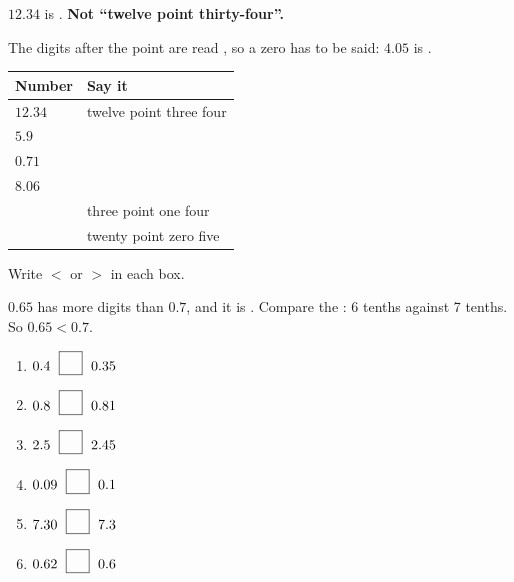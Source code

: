 \documentclass[12pt,a4paper]{article}
\newcommand{\nbox}{\ \fbox{\rule{0pt}{1.05em}\rule{1.0em}{0pt}}\ }
\begin{document}

\begin{remember}
  $12.34$ is . \;
  {\color{cbred}\bfseries Not ``twelve point thirty-four''.}

  \smallskip
  The digits after the point are read , so a zero has to be said:
  $4.05$ is .
\end{remember}

\vspace{2pt}
\noindent
\begin{tabularx}{\textwidth}{|C{2.4cm}|L|}
  \hline
  \textbf{Number} & \textbf{Say it} \\
  \hline
  $12.34$ \rule[-0.6em]{0pt}{1.9em} & twelve point three four \\ \hline
  $5.9$ \rule[-0.6em]{0pt}{1.9em}   & \\ \hline
  $0.71$ \rule[-0.6em]{0pt}{1.9em}  & \\ \hline
  $8.06$ \rule[-0.6em]{0pt}{1.9em}  & \\ \hline
  \rule[-0.6em]{0pt}{1.9em}         & three point one four \\ \hline
  \rule[-0.6em]{0pt}{1.9em}         & twenty point zero five \\ \hline
\end{tabularx}


\noindent Write $<$ or $>$ in each box.

\begin{remember}
  $0.65$ has more digits than $0.7$, and it is . Compare the
  : 6 tenths against 7 tenths. \; So $0.65 < 0.7$.
\end{remember}

\vspace{2pt}
\begin{multicols}{3}
\begin{enumerate}[label=(\alph*), itemsep=11pt]
  \item $0.4 \;\nbox\; 0.35$
  \item $0.8 \;\nbox\; 0.81$
  \item $2.5 \;\nbox\; 2.45$
  \item $0.09 \;\nbox\; 0.1$
  \item $7.30 \;\nbox\; 7.3$
  \item $0.62 \;\nbox\; 0.6$
\end{enumerate}
\end{multicols}
\end{document}

